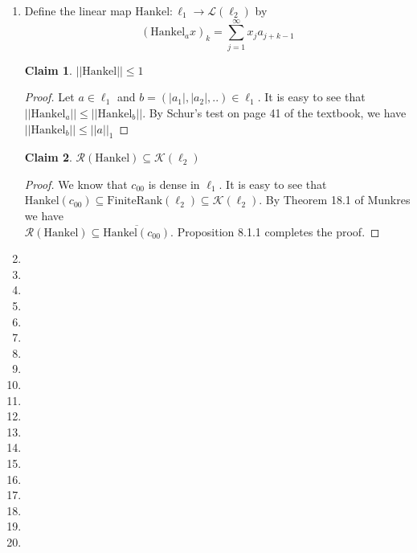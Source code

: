 \documentclass{article}
\newtheorem*{claim}{Claim}
\begin{document}
\begin{enumerate}
    \item Define the linear map $\text{Hankel}:\ell_1 \to \mathcal{L}(\ell_2)$ by \[(\text{Hankel}_ax)_k=\sum_{j=1}^\infty x_ja_{j+k-1}\]
    
    \begin{claim}
        $||\text{Hankel}|| \leq 1$ 
    \end{claim}

    \begin{proof}
        Let $a \in \ell_1$ and $b=(|a_1|,|a_2|,..) \in \ell_1$. It is easy to see that $||\text{Hankel}_a|| \leq ||\text{Hankel}_b||$. By Schur's test on page 41 of the textbook, we have $||\text{Hankel}_b|| \leq ||a||_1$
    \end{proof}

    \begin{claim}
        $\mathcal{R}(\text{Hankel}) \subseteq \mathcal{K}(\ell_2)$
    \end{claim}

    \begin{proof}
        We know that $c_{00}$ is dense in $\ell_1$. It is easy to see that $\text{Hankel}(c_{00}) \subseteq \text{FiniteRank}(\ell_2) \subseteq \mathcal{K}(\ell_2)$. By Theorem 18.1 of Munkres we have \\ $\mathcal{R}(\text{Hankel}) \subseteq \overline{\text{Hankel}(c_{00})}$. Proposition 8.1.1 completes the proof.
    \end{proof}
    
    \item 
    \item 
    \item 
    \item 
    \item 
    \item 
    \item 
    \item 
    \item 
    \item 
    \item 
    \item 
    \item 
    \item 
    \item 
    \item 
    \item 
    \item 
    \item 
\end{enumerate}
\end{document}
